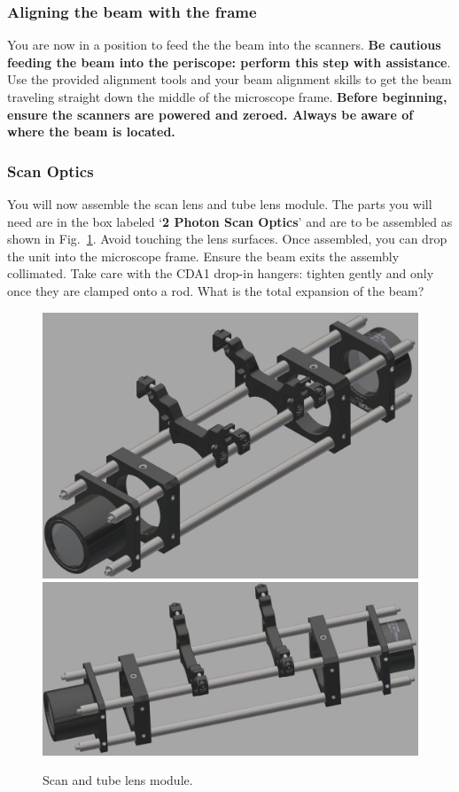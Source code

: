 \documentclass[a4paper]{report}
\begin{document}
\clearpage

\subsubsection{Aligning the beam with the frame}
You are now in a position to feed the the beam into the scanners. 
\textbf{Be cautious feeding the beam into the periscope: perform this step with assistance}. 
Use the provided alignment tools and your beam alignment skills to get the beam traveling straight down the middle of the microscope frame. 
\textbf{Before beginning, ensure the scanners are powered and zeroed. Always be aware of where the beam is located.}

\subsubsection{Scan Optics}
You will now assemble the scan lens and tube lens module. 
The parts you will need are in the box labeled `\textbf{2 Photon Scan Optics}' and are to be assembled as shown in Fig.~\ref{fig:scan_optics}.
Avoid touching the lens surfaces. 
Once assembled, you can drop the unit into the microscope frame. 
Ensure the beam exits the assembly collimated. 
Take care with the CDA1 drop-in hangers: tighten gently and only once they are clamped onto a rod.
What is the total expansion of the beam?



\begin{figure}[h]
\center
\includegraphics[width=4.5in]{scan_optics_01.eps}
\includegraphics[width=4.5in]{scan_optics_02.eps}
\caption{Scan and tube lens module.}
\label{fig:scan_optics}
\end{figure}
\end{document}
